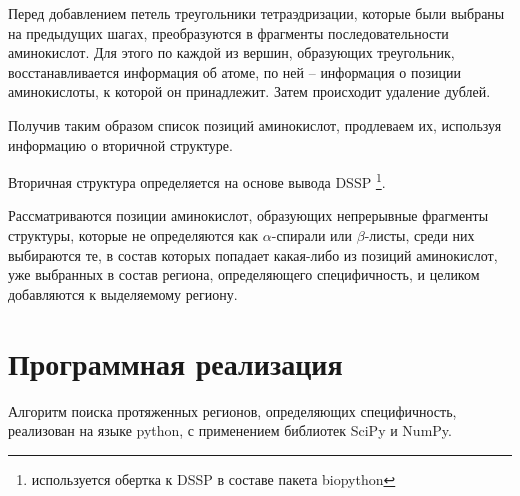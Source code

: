 Перед добавлением петель треугольники тетраэдризации, которые были выбраны на предыдущих шагах, преобразуются в фрагменты последовательности аминокислот. Для этого по каждой из вершин, образующих треугольник, восстанавливается информация об атоме, по ней -- информация о позиции аминокислоты, к которой он принадлежит. Затем происходит удаление дублей.

Получив таким образом список позиций аминокислот, продлеваем их, используя информацию о вторичной структуре.

Вторичная структура определяется на основе вывода DSSP \footnote{используется обертка к DSSP в составе пакета biopython}.

Рассматриваются позиции аминокислот, образующих непрерывные фрагменты структуры, которые не определяются как $\alpha$-спирали или $\beta$-листы, среди них выбираются те, в состав которых попадает какая-либо из позиций аминокислот, уже выбранных в состав региона, определяющего специфичность, и целиком добавляются к выделяемому региону.












\section{Программная реализация}

Алгоритм поиска протяженных регионов, определяющих специфичность, реализован на языке python, с применением библиотек SciPy\cite{scipy} и NumPy\cite{numpy}.

